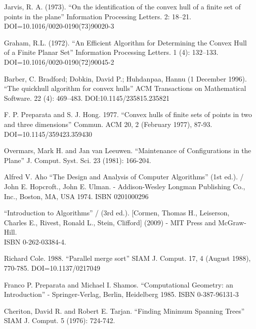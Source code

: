 \documentclass[conference]{IEEEtran}
\theoremstyle{plane}
\begin{document}
\begin{thebibliography}{00}
	 Jarvis, R. A. (1973). ``On the identification of the convex hull of a finite set of points in the plane'' Information Processing Letters. 2: 18–21. DOI=10.1016/0020-0190(73)90020-3
	
	Graham, R.L. (1972). 
	``An Efficient Algorithm for Determining the Convex Hull of a Finite Planar Set'' Information Processing Letters. 1 (4): 132–133. DOI=10.1016/0020-0190(72)90045-2
	
	Barber, C. Bradford; Dobkin, David P.; Huhdanpaa, Hannu (1 December 1996).
	``The quickhull algorithm for convex hulls''
	ACM Transactions on Mathematical Software. 22 (4): 469–483. DOI:10.1145/235815.235821 
	
	F. P. Preparata and S. J. Hong. 1977. 
	``Convex hulls of finite sets of points in two and three dimensions''
	Commun. ACM 20, 2 (February 1977), 87-93. DOI=10.1145/359423.359430
	
	Overmars, Mark H. and Jan van Leeuwen.  
	``Maintenance of Configurations in the Plane''
	J. Comput. Syst. Sci. 23 (1981): 166-204.
	
	Alfred V. Aho 
	``The Design and Analysis of Computer Algorithms'' (1st ed.). / John E. Hopcroft., John E. Ulman. -
	Addison-Wesley Longman Publishing Co., Inc., Boston, MA, USA 1974. ISBN 0201000296
	
	``Introduction to Algorithms'' / (3rd ed.).
	[Cormen, Thomas H., Leiserson, Charles E., Rivest, Ronald L., Stein, Clifford] (2009) - MIT Press and McGraw-Hill.\\ ISBN 0-262-03384-4.
	
	 Richard Cole. 1988.  
	``Parallel merge sort'' SIAM J. Comput. 17, 4 (August 1988), 770-785. DOI=10.1137/0217049
	
	
	Franco P. Preparata and  Michael I. Shamos. ``Computational Geometry: an Introduction'' - Springer-Verlag, Berlin, Heidelberg 1985.
	ISBN 0-387-96131-3
	
	Cheriton, David R. and Robert E. Tarjan.
	``Finding Minimum Spanning Trees''
	SIAM J. Comput. 5 (1976): 724-742.	
\end{thebibliography}
\end{document}
